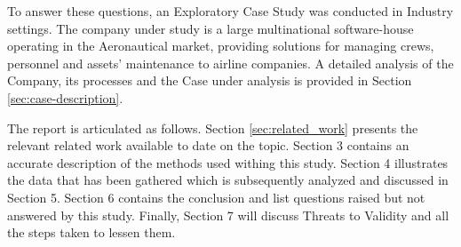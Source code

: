 To answer these questions, an Exploratory Case Study was conducted in Industry settings. The company under study is a large multinational software-house operating in the Aeronautical market, providing solutions for managing crews, personnel and assets' maintenance to airline companies. A detailed analysis of the Company, its processes and the Case under analysis is provided in Section \ref{sec:case-description}.

The report is articulated as follows. Section \ref{sec:related_work} presents the relevant related work available to date on the topic. Section 3 contains an accurate description of the methods used withing this study. Section 4 illustrates the data that has been gathered which is subsequently analyzed and discussed in Section 5. Section 6 contains the conclusion and list questions raised but not answered by this study. Finally, Section 7 will discuss Threats to Validity and all the steps taken to lessen them.
